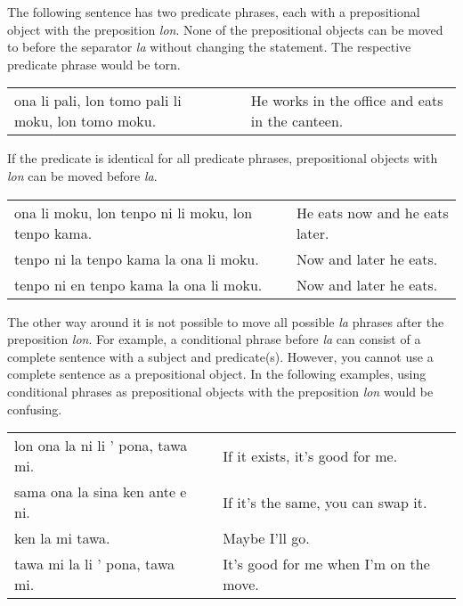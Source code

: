 The following sentence has two predicate phrases, each with a prepositional object with the preposition \textit{lon}.
None of the prepositional objects can be moved to before the separator \textit{la} without changing the statement.
The respective predicate phrase would be torn.

\begin{supertabular}{p{5,5cm}|ll}
    ona li pali, lon tomo pali li moku, lon tomo moku. &  & He works in the office and eats in the canteen. \\
\end{supertabular}

If the predicate is identical for all predicate phrases, prepositional objects with \textit{lon} can be moved before \textit{la}.

\begin{supertabular}{p{5,5cm}|ll}
    ona li moku, lon tenpo ni li moku, lon tenpo kama. &  & He eats now and he eats later. \\
    tenpo ni la tenpo kama la ona li moku.             &  & Now and later he eats.         \\
    tenpo ni en tenpo kama la ona li moku.             &  & Now and later he eats.         \\
\end{supertabular}

The other way around it is not possible to move all possible \textit{la} phrases after the preposition \textit{lon}.
For example, a conditional phrase before \textit{la} can consist of a complete sentence with a subject and predicate(s).
However, you cannot use a complete sentence as a prepositional object.
In the following examples, using conditional phrases as prepositional objects with the preposition \textit{lon} would be confusing.

\begin{supertabular}{p{5,5cm}|ll}
    lon ona la ni li ' pona, tawa mi. &  & If it exists, it's good for me.        \\
    sama ona la sina ken ante e ni.   &  & If it's the same, you can swap it.     \\
    ken la mi tawa.                   &  & Maybe I'll go.                         \\
    tawa mi la li ' pona, tawa mi.    &  & It's good for me when I'm on the move. \\
\end{supertabular}

%
%
